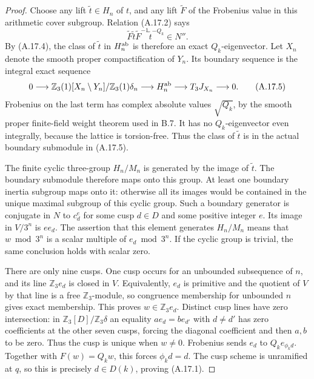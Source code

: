 \begin{proof}
Choose any lift $\widetilde t\in H_n$ of $t$, and any
lift $\widetilde F$ of the Frobenius value in this arithmetic
cover subgroup. Relation (A.17.2) says
\[
 \widetilde F\widetilde t\widetilde F^{-1}
                      \widetilde t^{-Q_k}\in N''.
\]
By (A.17.4), the class of $\widetilde t$ in $H_n^{\rm ab}$
is therefore an exact $Q_k$-eigenvector. Let $X_n$ denote
the smooth proper compactification of $Y_n$. Its boundary
sequence is the integral exact sequence
\[
 0\longrightarrow
 \mathbb Z_3(1)[X_n\setminus Y_n]/\mathbb Z_3(1)\delta_n
 \longrightarrow H_n^{\rm ab}
 \longrightarrow T_3J_{X_n}\longrightarrow0.
 \tag{A.17.5}
\]
Frobenius on the last term has complex absolute values
$\sqrt{Q_k}$, by the smooth proper finite-field weight
theorem used in B.7. It has no $Q_k$-eigenvector even
integrally, because the lattice is torsion-free. Thus the
class of $\widetilde t$ is in the actual boundary submodule
in (A.17.5).

The finite cyclic three-group $H_n/M_n$ is generated by
the image of $\widetilde t$. The boundary submodule
therefore maps onto this group. At least one boundary
inertia subgroup maps onto it: otherwise all its images
would be contained in the unique maximal subgroup of this
cyclic group. Such a boundary generator is conjugate in
$N$ to $c_d^e$ for some cusp $d\in D$ and some positive
integer $e$. Its image in $V/3^n$ is $e e_d$.
The assertion that this element generates $H_n/M_n$
means that $w\bmod3^n$ is a scalar multiple of
$e_d\bmod3^n$. If the cyclic group is trivial, the same
conclusion holds with scalar zero.

There are only nine cusps. One cusp occurs for an unbounded
subsequence of $n$, and its line $\mathbb Z_3e_d$ is closed
in $V$. Equivalently, $e_d$ is primitive and the quotient
of $V$ by that line is a free $\mathbb Z_3$-module, so
congruence membership for unbounded $n$ gives exact
membership. This proves $w\in\mathbb Z_3e_d$.
Distinct cusp lines have zero intersection: in
$\mathbb Z_3[D]/\mathbb Z_3\delta$ an equality
$a e_d=b e_{d'}$ with $d\ne d'$ has zero coefficients
at the other seven cusps, forcing the diagonal coefficient
and then $a,b$ to be zero. Thus the cusp is unique when
$w\ne0$. Frobenius sends $e_d$ to $Q_ke_{\phi_k d}$.
Together with $F(w)=Q_kw$, this forces $\phi_k d=d$.
The cusp scheme is unramified at $q$, so this is precisely
$d\in D(k)$, proving (A.17.1).
\end{proof}


